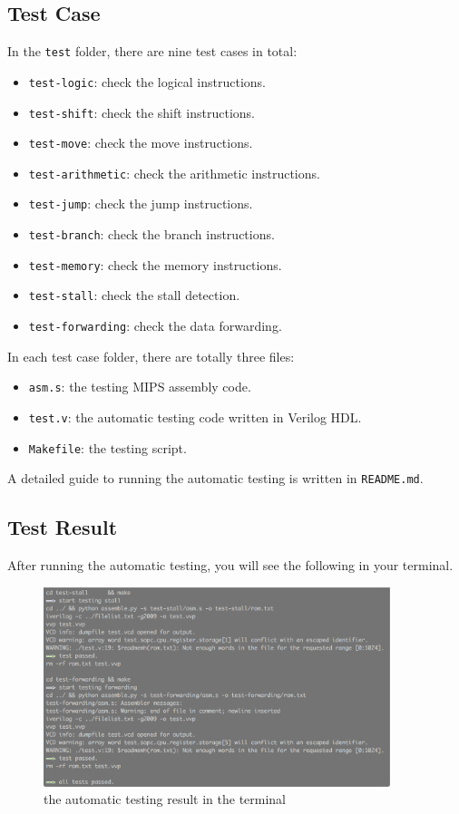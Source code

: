 \documentclass{article}
\begin{document}
\subsection{Test Case}
In the \texttt{test} folder, there are nine test cases in total:
\begin{itemize}
\item
\texttt{test-logic}: check the logical instructions.
\item
\texttt{test-shift}: check the shift instructions.
\item
\texttt{test-move}: check the move instructions.
\item
\texttt{test-arithmetic}: check the arithmetic instructions.
\item
\texttt{test-jump}: check the jump instructions.
\item
\texttt{test-branch}: check the branch instructions.
\item
\texttt{test-memory}: check the memory instructions.
\item
\texttt{test-stall}: check the stall detection.
\item
\texttt{test-forwarding}: check the data forwarding.
\end{itemize}
In each test case folder, there are totally three files:
\begin{itemize}
\item
\texttt{asm.s}: the testing MIPS assembly code.
\item
\texttt{test.v}: the automatic testing code written in Verilog HDL.
\item
\texttt{Makefile}: the testing script.
\end{itemize}
A detailed guide to running the automatic testing is written in \texttt{README.md}.

\subsection{Test Result}
After running the automatic testing, you will see the following in your terminal.
\begin{figure}[!h]
\begin{center}
\includegraphics[width=0.9\textwidth]{image/terminal}
\caption{the automatic testing result in the terminal}
\end{center}
\end{figure}
\end{document}
